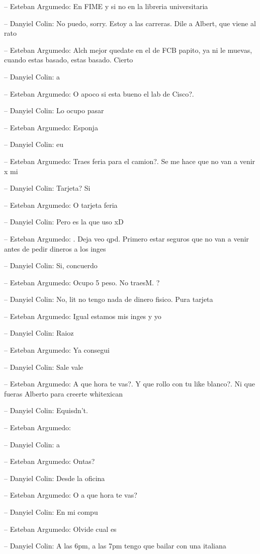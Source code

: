 -- Esteban Argumedo: En FIME y si no en la libreria universitaria

-- Danyiel Colin: No puedo, sorry. Estoy a las carreras. Dile a Albert,
que viene al rato

-- Esteban Argumedo: Alch mejor quedate en el de FCB papito, ya ni le
muevas, cuando estas basado, estas basado. Cierto

-- Danyiel Colin: a

-- Esteban Argumedo: O apoco si esta bueno el lab de Cisco?.

-- Danyiel Colin: Lo ocupo pasar

-- Esteban Argumedo: Esponja

-- Danyiel Colin: eu

-- Esteban Argumedo: Traes feria para el camion?. Se me hace que no van
a venir x mi

-- Danyiel Colin: Tarjeta? Si

-- Esteban Argumedo: O tarjeta feria

-- Danyiel Colin: Pero es la que uso xD

-- Esteban Argumedo: . Deja veo qpd. Primero estar seguros que no van a
venir antes de pedir dineros a los inges

-- Danyiel Colin: Si, concuerdo

-- Esteban Argumedo: Ocupo 5 peso. No traesM. ?

-- Danyiel Colin: No, lit no tengo nada de dinero fisico. Pura tarjeta

-- Esteban Argumedo: Igual estamos mis inges y yo

-- Danyiel Colin: Raioz

-- Esteban Argumedo: Ya consegui

-- Danyiel Colin: Sale vale

-- Esteban Argumedo: A que hora te vas?. Y que rollo con tu like
blanco?. Ni que fueras Alberto para creerte whitexican

-- Danyiel Colin: Equisdn't.

-- Esteban Argumedo:

-- Danyiel Colin: a

-- Esteban Argumedo: Ontas?

-- Danyiel Colin: Desde la oficina

-- Esteban Argumedo: O a que hora te vas?

-- Danyiel Colin: En mi compu

-- Esteban Argumedo: Olvide cual es

-- Danyiel Colin: A las 6pm, a las 7pm tengo que bailar con una italiana

